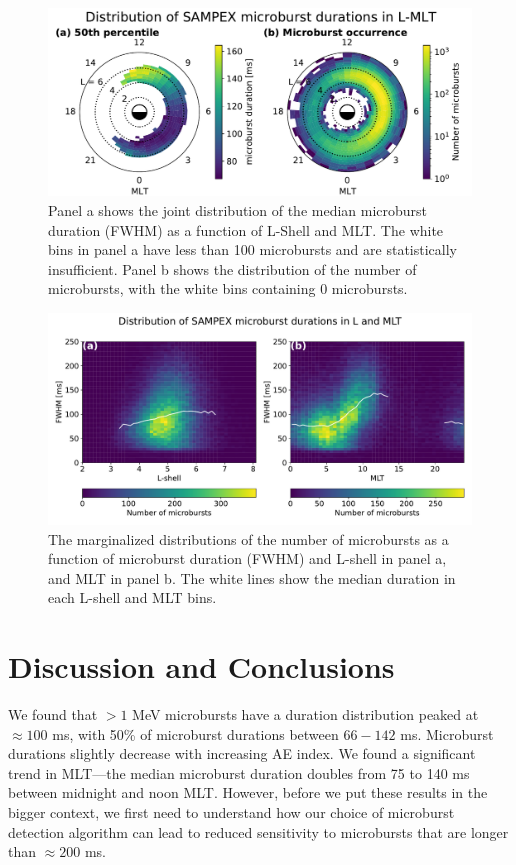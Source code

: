 \documentclass[draft]{agujournal2019}
\begin{document}
\begin{figure}
\noindent\includegraphics[width=\textwidth]{figures/fig3.pdf}
\caption{Panel a shows the joint distribution of the median microburst duration (FWHM) as a function of L-Shell and MLT. The white bins in panel a have less than 100 microbursts and are statistically insufficient. Panel b shows the distribution of the number of microbursts, with the white bins containing 0 microbursts.}
\label{fig3}
\end{figure}

\begin{figure}
\noindent\includegraphics[width=\textwidth]{figures/fig4_v7.pdf}
\caption{The marginalized distributions of the number of microbursts as a function of microburst duration (FWHM) and L-shell in panel a, and MLT in panel b. The white lines show the median duration in each L-shell and MLT bins.}
\label{fig4}
\end{figure}

\section{Discussion and Conclusions}\label{discussion}

We found that $>1$ MeV microbursts have a duration distribution peaked at $\approx 100$ ms, with 50\% of microburst durations between $66-142$ ms. Microburst durations slightly decrease with increasing AE index. We found a significant trend in MLT---the median microburst duration doubles from 75 to 140 ms between midnight and noon MLT. However, before we put these results in the bigger context, we first need to understand how our choice of microburst detection algorithm can lead to reduced sensitivity to microbursts that are longer than $\approx 200$ ms.
\end{document}
